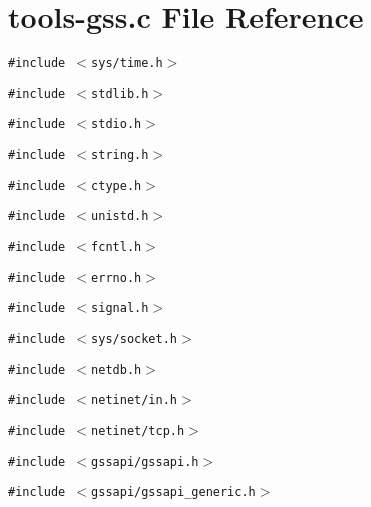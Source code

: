 \section{tools-gss.c File Reference}
\label{tools-gss_8c}
{\tt \#include $<$sys/time.h$>$}\par
{\tt \#include $<$stdlib.h$>$}\par
{\tt \#include $<$stdio.h$>$}\par
{\tt \#include $<$string.h$>$}\par
{\tt \#include $<$ctype.h$>$}\par
{\tt \#include $<$unistd.h$>$}\par
{\tt \#include $<$fcntl.h$>$}\par
{\tt \#include $<$errno.h$>$}\par
{\tt \#include $<$signal.h$>$}\par
{\tt \#include $<$sys/socket.h$>$}\par
{\tt \#include $<$netdb.h$>$}\par
{\tt \#include $<$netinet/in.h$>$}\par
{\tt \#include $<$netinet/tcp.h$>$}\par
{\tt \#include $<$gssapi/gssapi.h$>$}\par
{\tt \#include $<$gssapi/gssapi\_\-generic.h$>$}\par
